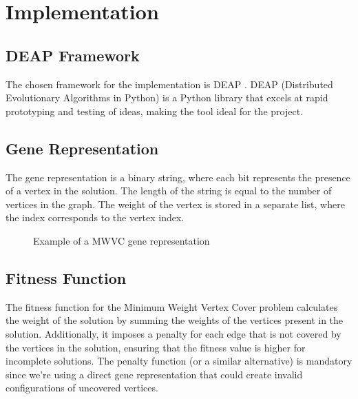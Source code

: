 \chapter{Implementation}

\section{DEAP Framework}

\par
The chosen framework for the implementation is DEAP \cite{DEAP_JMLR2012}.
DEAP (Distributed Evolutionary Algorithms in Python) is a Python library that excels at rapid prototyping and testing of ideas, making the tool ideal for the project.

\section{Gene Representation}

The gene representation is a binary string, where each bit represents the presence of a vertex in the solution.
The length of the string is equal to the number of vertices in the graph.
The weight of the vertex is stored in a separate list, where the index corresponds to the vertex index.

\begin{figure}[ht]
\centering
{}
\caption{Example of a MWVC gene representation}
\end{figure}

\section{Fitness Function}

The fitness function for the Minimum Weight Vertex Cover problem calculates the weight of the solution by summing the weights of the vertices present in the solution.
Additionally, it imposes a penalty for each edge that is not covered by the vertices in the solution, ensuring that the fitness value is higher for incomplete solutions.
The penalty function (or a similar alternative) is mandatory since we're using a direct gene representation that could create invalid configurations of uncovered vertices.

